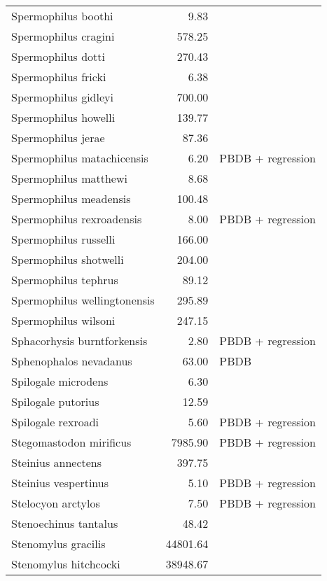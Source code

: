 \begin{table}[ht]
\begin{tabular}{lrl}
  Spermophilus boothi & 9.83 & \cite{Secord2008a} \\ 
  Spermophilus cragini & 578.25 & \cite{Tomiya2013} \\ 
  Spermophilus dotti & 270.43 & \cite{Tomiya2013} \\ 
  Spermophilus fricki & 6.38 & \cite{Simons1960} \\ 
  Spermophilus gidleyi & 700.00 & \cite{McKenna2011} \\ 
  Spermophilus howelli & 139.77 & \cite{Tomiya2013} \\ 
  Spermophilus jerae & 87.36 & \cite{Tomiya2013} \\ 
  Spermophilus matachicensis & 6.20 & PBDB + regression \\ 
  Spermophilus matthewi & 8.68 & \cite{Beatty2009} \\ 
  Spermophilus meadensis & 100.48 & \cite{Tomiya2013} \\ 
  Spermophilus rexroadensis & 8.00 & PBDB + regression \\ 
  Spermophilus russelli & 166.00 & \cite{McKenna2011} \\ 
  Spermophilus shotwelli & 204.00 & \cite{McKenna2011} \\ 
  Spermophilus tephrus & 89.12 & \cite{Tomiya2013} \\ 
  Spermophilus wellingtonensis & 295.89 & \cite{Tomiya2013} \\ 
  Spermophilus wilsoni & 247.15 & \cite{Tomiya2013} \\ 
  Sphacorhysis burntforkensis & 2.80 & PBDB + regression \\ 
  Sphenophalos nevadanus & 63.00 & PBDB \\ 
  Spilogale microdens & 6.30 & \cite{Chester2012} \\ 
  Spilogale putorius & 12.59 & \cite{Smith2004} \\ 
  Spilogale rexroadi & 5.60 & PBDB + regression \\ 
  Stegomastodon mirificus & 7985.90 & PBDB + regression \\ 
  Steinius annectens & 397.75 & \cite{Strait2001} \\ 
  Steinius vespertinus & 5.10 & PBDB + regression \\ 
  Stelocyon arctylos & 7.50 & PBDB + regression \\ 
  Stenoechinus tantalus & 48.42 & \cite{Tomiya2013} \\ 
  Stenomylus gracilis & 44801.64 & \cite{Tomiya2013} \\ 
  Stenomylus hitchcocki & 38948.67 & \cite{Tomiya2013} \\ 

\end{tabular}
\end{table}
